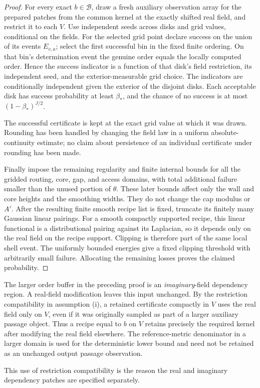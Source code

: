 \begin{proof}
For every exact $b\in\mathcal B$, draw a fresh auxiliary
observation array for the prepared patches from the common kernel
at the exactly shifted real field, and restrict it to each $V$.
Use independent
seeds across disks and grid values, conditional on the fields.
For the selected grid point declare success on the union of its
events $E_{v,a}$; select the first successful bin in the fixed
finite ordering.  On that bin's determination event the genuine
order equals the locally computed order.  Hence the success indicator is
a function of that disk's field restriction, its independent
seed, and the exterior-measurable grid choice.  The indicators
are conditionally independent given the exterior of the
disjoint disks.  Each acceptable disk has success probability
at least $\beta_*$, and the chance of no success is at most
$(1-\beta_*)^{J/2}$.

The successful certificate is kept at the exact grid value
at which it was drawn.  Rounding has been handled by changing
the field law in a uniform absolute-continuity estimate;
no claim about persistence of an individual certificate under
rounding has been made.

Finally impose the remaining regularity and finite internal bounds
for all the gridded routing, core, gap, and access domains, with total additional
failure smaller than the unused portion of $\theta$.
These later bounds affect only the wall and core heights and
the smoothing widths.  They do not change the cap modulus
or $A'$.  After the resulting finite smooth recipe list is
fixed, truncate its finitely many Gaussian linear pairings.
For a smooth compactly supported recipe, this linear functional is a
distributional pairing against its Laplacian, so it depends only on
the real field on the recipe support.  Clipping is therefore part of
the same local shell event.  The uniformly bounded energies give a
fixed clipping threshold with arbitrarily small failure.  Allocating the
remaining losses proves the claimed probability.
\end{proof}

\begin{remark}
\label{comp:separate-field-dependencies}
The larger order buffer in the preceding proof is an
\emph{imaginary}-field dependency region.  A real-field
modification leaves this input unchanged.  By the restriction
compatibility in assumption (i), a retained certificate
compactly in $V$ uses the real field only on $V$, even if it
was originally sampled as part of a larger auxiliary passage
object.  Thus a recipe equal to $b$ on $V$ retains precisely
the required kernel after modifying the real field elsewhere.
The reference-metric denominator in a larger domain is used
for the deterministic lower bound and need not be retained
as an unchanged output passage observation.

This use of restriction compatibility is the reason the real and
imaginary dependency patches are specified separately.
\end{remark}

